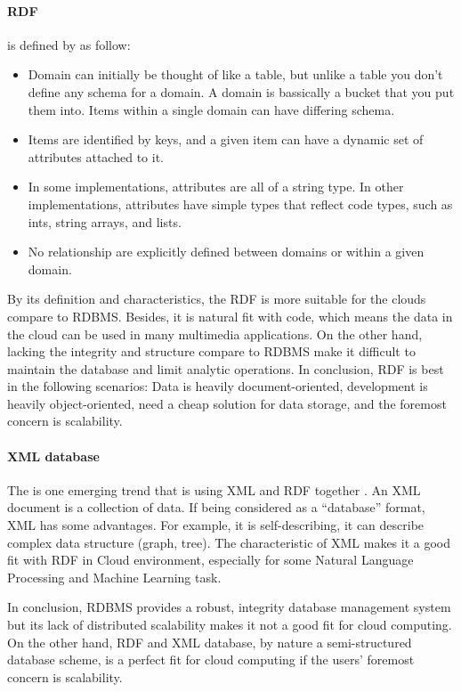 \documentclass[a4paper,12pt]{article}
\begin{document}
\paragraph{RDF} is defined by \cite{doom} as follow:
\begin{itemize}
    \setlength{\itemsep}{0cm}
    \setlength{\parskip}{0cm}
    \item Domain can initially be thought of like a table, but unlike a table you don't define any schema for a domain. A domain is bassically a bucket that you put them into. Items within a single domain can have differing schema.
    \item Items are identified by keys, and a given item can have a dynamic set of attributes attached to it.
    \item In some implementations, attributes are all of a string type. In other implementations, attributes have simple types that reflect code types, such as ints, string arrays, and lists.
    \item No relationship are explicitly defined between domains or within a given domain.
\end{itemize}
By its definition and characteristics, the RDF is more suitable for the clouds compare to RDBMS. Besides, it is natural fit with code, which means the data in the cloud can be used in many multimedia applications. On the other hand, lacking the integrity and structure compare to RDBMS make it difficult to maintain the database and limit analytic operations. In conclusion, RDF is best in the following scenarios: Data is heavily document-oriented, development is heavily object-oriented, need a cheap solution for data storage, and the foremost concern is scalability.

\paragraph{XML database} The is one emerging trend that is using XML and RDF together \cite{xml}. An XML document is a collection of data. If being considered as a ``database'' format, XML has some advantages. For example, it is self-describing, it can describe complex data structure (graph, tree). The characteristic of XML makes it a good fit with RDF in Cloud environment, especially for some Natural Language Processing and Machine Learning task.

In conclusion, RDBMS provides a robust, integrity database management system but its lack of distributed scalability makes it not a good fit for cloud computing. On the other hand, RDF and XML database, by nature a semi-structured database scheme, is a perfect fit for cloud computing if the users' foremost concern is scalability.
\end{document}
